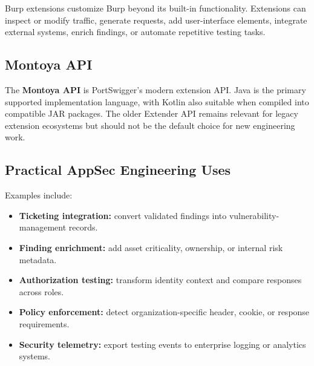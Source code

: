 \documentclass[11pt]{article}
\begin{document}
Burp extensions customize Burp beyond its built-in functionality. Extensions can inspect or modify traffic, generate requests, add user-interface elements, integrate external systems, enrich findings, or automate repetitive testing tasks.

\subsection{Montoya API}

The \textbf{Montoya API} is PortSwigger's modern extension API. Java is the primary supported implementation language, with Kotlin also suitable when compiled into compatible JAR packages. The older Extender API remains relevant for legacy extension ecosystems but should not be the default choice for new engineering work.

\begin{center}
\end{center}

\subsection{Practical AppSec Engineering Uses}

Examples include:

\begin{itemize}
  \item \textbf{Ticketing integration:} convert validated findings into vulnerability-management records.
  \item \textbf{Finding enrichment:} add asset criticality, ownership, or internal risk metadata.
  \item \textbf{Authorization testing:} transform identity context and compare responses across roles.
  \item \textbf{Policy enforcement:} detect organization-specific header, cookie, or response requirements.
  \item \textbf{Security telemetry:} export testing events to enterprise logging or analytics systems.
\end{itemize}
\end{document}
